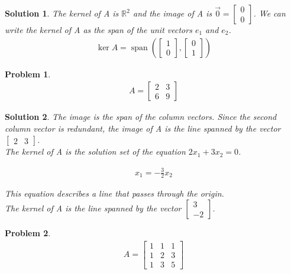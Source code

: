 \documentclass{article}
\newtheorem{problem}{Problem}
\newtheorem*{solution}{Solution}
\DeclareMathOperator{\Span}{span}
\begin{document}
\begin{solution}
The kernel of A is $\mathbb{R}^2$ and the image of A is $\vec{0} = \begin{bmatrix} 0 \\ 0 \end{bmatrix}$. We can write the kernel of A as the span of the unit vectors $e_{1}$ and $e_{2}$.
\begin{align*}
\ker A = \Span \left( \begin{bmatrix}1 \\ 0 \end{bmatrix}, \begin{bmatrix}0 \\ 1 \end{bmatrix} \right)
\end{align*}
\end{solution}

\begin{problem}
\begin{align*}
A = \begin{bmatrix}2 & 3 \\ 6 & 9 \end{bmatrix}
\end{align*}
\end{problem}

\begin{solution}

The image is the span of the column vectors. Since the second column vector is redundant, the image of A is the line spanned by the vector $\begin{bmatrix}2 & 3 \end{bmatrix}$. \\

The kernel of A is the solution set of the equation $2x_{1} + 3x_{2} = 0$.

\begin{align*}
\displaystyle x_{1} = -\frac{3}{2}x_{2}
\end{align*}

This equation describes a line that passes through the origin. \\

The kernel of A is the line spanned by the vector $\begin{bmatrix}3 \\ -2 \end{bmatrix}$.
\end{solution}

\begin{problem}
\begin{align*}
A = \begin{bmatrix}1 & 1 & 1 \\ 1 & 2 & 3 \\ 1 & 3 & 5 \end{bmatrix}
\end{align*}
\end{problem}
\end{document}

